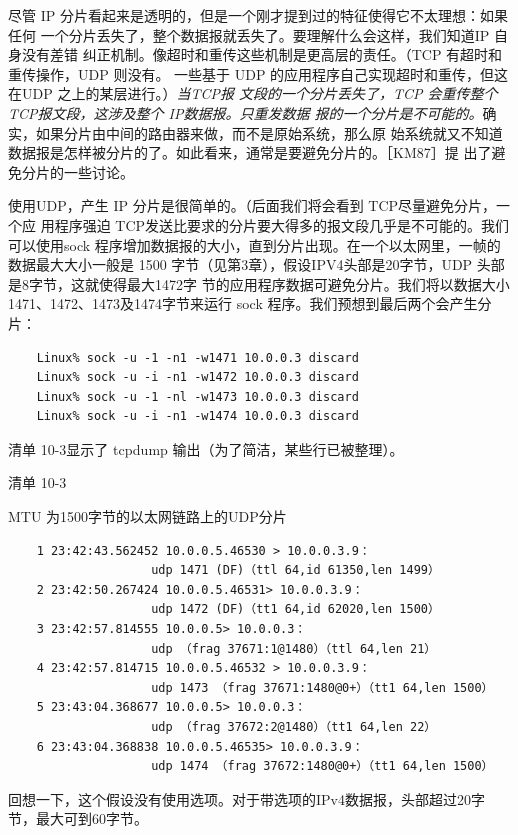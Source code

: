 尽管 IP 分片看起来是透明的，但是一个刚才提到过的特征使得它不太理想：如果任何
一个分片丢失了，整个数据报就丢失了。要理解什么会这样，我们知道IP 自身没有差错
纠正机制。像超时和重传这些机制是更高层的责任。（TCP 有超时和重传操作，UDP 则没有。
一些基于 UDP 的应用程序自己实现超时和重传，但这在UDP 之上的某层进行。）\emph{当TCP报
文段的一个分片丢失了，TCP 会重传整个 TCP报文段，这涉及整个 IP数据报。只重发数据
报的一个分片是不可能的。}确实，如果分片由中间的路由器来做，而不是原始系统，那么原
始系统就又不知道数据报是怎样被分片的了。如此看来，通常是要避免分片的。［KM87］提
出了避免分片的一些讨论。

使用UDP，产生 IP 分片是很简单的。（后面我们将会看到 TCP尽量避免分片，一个应
用程序强迫 TCP发送比要求的分片要大得多的报文段几乎是不可能的。我们可以使用sock
程序增加数据报的大小，直到分片出现。在一个以太网里，一帧的数据最大大小一般是 1500
字节（见第3章），假设IPV4头部是20字节，UDP 头部是8字节，这就使得最大1472字
节的应用程序数据可避免分片。我们将以数据大小 1471、1472、1473及1474字节来运行
sock 程序。我们预想到最后两个会产生分片：

\begin{verbatim}
    Linux% sock -u -1 -n1 -w1471 10.0.0.3 discard
    Linux% sock -u -i -n1 -w1472 10.0.0.3 discard
    Linux% sock -u -1 -nl -w1473 10.0.0.3 discard
    Linux% sock -u -i -n1 -w1474 10.0.0.3 discard
\end{verbatim}

清单 10-3显示了 tcpdump 输出（为了简洁，某些行已被整理）。

清单 10-3

MTU 为1500字节的以太网链路上的UDP分片

\begin{verbatim}
    1 23:42:43.562452 10.0.0.5.46530 > 10.0.0.3.9：
                    udp 1471 (DF)（ttl 64,id 61350,len 1499）
    2 23:42:50.267424 10.0.0.5.46531> 10.0.0.3.9：
                    udp 1472 (DF)（tt1 64,id 62020,len 1500）
    3 23:42:57.814555 10.0.0.5> 10.0.0.3：
                    udp （frag 37671:1@1480）（ttl 64,len 21）
    4 23:42:57.814715 10.0.0.5.46532 > 10.0.0.3.9：
                    udp 1473 （frag 37671:1480@0+）（tt1 64,len 1500）
    5 23:43:04.368677 10.0.0.5> 10.0.0.3：
                    udp （frag 37672:2@1480）（tt1 64,len 22）
    6 23:43:04.368838 10.0.0.5.46535> 10.0.0.3.9：
                    udp 1474 （frag 37672:1480@0+）（tt1 64,len 1500）
\end{verbatim}

回想一下，这个假设没有使用选项。对于带选项的IPv4数据报，头部超过20字节，最大可到60字节。

